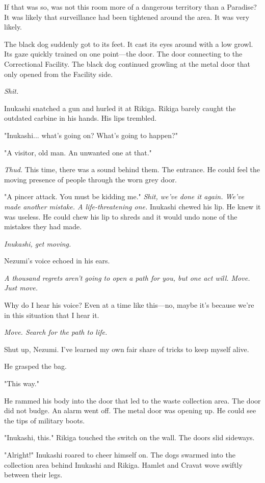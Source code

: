 If that was so, was not this room more of a dangerous territory than a
Paradise? It was likely that surveillance had been tightened around the
area. It was very likely.

The black dog suddenly got to its feet. It cast its eyes around with a
low growl. Its gaze quickly trained on one point---the door. The door
connecting to the Correctional Facility. The black dog continued
growling at the metal door that only opened from the Facility side.

\emph{Shit.}

Inukashi snatched a gun and hurled it at Rikiga. Rikiga barely caught
the outdated carbine in his hands. His lips trembled.

"Inukashi... what's going on? What's going to happen?"

"A visitor, old man. An unwanted one at that."

\emph{Thud.} This time, there was a sound behind them. The entrance. He could
feel the moving presence of people through the worn grey door.

"A pincer attack. You must be kidding me." \emph{Shit, we've done it again.
We've made another mistake. A life-threatening one.} Inukashi chewed his
lip. He knew it was useless. He could chew his lip to shreds and it
would undo none of the mistakes they had made.

\emph{Inukashi, get moving.}

Nezumi's voice echoed in his ears.

\emph{A thousand regrets aren't going to open a path for you, but one act
will. Move. Just move.}

Why do I hear his voice? Even at a time like this---no, maybe it's because
we're in this situation that I hear it.

\emph{Move. Search for the path to life.}

Shut up, Nezumi. I've learned my own fair share of tricks to keep myself
alive.

He grasped the bag.

"This way."

He rammed his body into the door that led to the waste collection area.
The door did not budge. An alarm went off. The metal door was opening
up. He could see the tips of military boots.

"Inukashi, this." Rikiga touched the switch on the wall. The doors slid
sideways.

"Alright!" Inukashi roared to cheer himself on. The dogs swarmed into
the collection area behind Inukashi and Rikiga. Hamlet and Cravat wove
swiftly between their legs.

